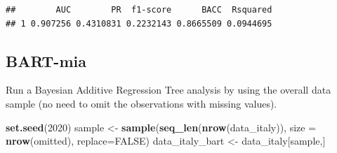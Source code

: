 \documentclass[]{article}
\newenvironment{Shaded}{\begin{snugshade}}{\end{snugshade}}
\newcommand{\DataTypeTok}[1]{\textcolor[rgb]{0.13,0.29,0.53}{#1}}
\newcommand{\DecValTok}[1]{\textcolor[rgb]{0.00,0.00,0.81}{#1}}
\newcommand{\KeywordTok}[1]{\textcolor[rgb]{0.13,0.29,0.53}{\textbf{#1}}}
\newcommand{\NormalTok}[1]{#1}
\newcommand{\OperatorTok}[1]{\textcolor[rgb]{0.81,0.36,0.00}{\textbf{#1}}}
\newcommand{\OtherTok}[1]{\textcolor[rgb]{0.56,0.35,0.01}{#1}}
\newcommand{\StringTok}[1]{\textcolor[rgb]{0.31,0.60,0.02}{#1}}
\begin{document}
\begin{Shaded}
\end{Shaded}

\begin{Shaded}
\end{Shaded}

\begin{verbatim}
##        AUC        PR  f1-score      BACC  Rsquared
## 1 0.907256 0.4310831 0.2232143 0.8665509 0.0944695
\end{verbatim}

\hypertarget{bart-mia}{%
\subsection{BART-mia}\label{bart-mia}}

Run a Bayesian Additive Regression Tree analysis by using the overall
data sample (no need to omit the observations with missing values).

\begin{Shaded}
\begin{Highlighting}[]
\KeywordTok{set.seed}\NormalTok{(}\DecValTok{2020}\NormalTok{)}
\NormalTok{sample <-}\StringTok{ }\KeywordTok{sample}\NormalTok{(}\KeywordTok{seq_len}\NormalTok{(}\KeywordTok{nrow}\NormalTok{(data_italy)),}
                 \DataTypeTok{size =} \KeywordTok{nrow}\NormalTok{(omitted),}
                 \DataTypeTok{replace=}\OtherTok{FALSE}\NormalTok{) }
\NormalTok{data_italy_bart <-}\StringTok{ }\NormalTok{data_italy[sample,]}
\end{Highlighting}
\end{Shaded}
\end{document}
